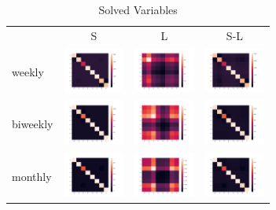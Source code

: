 \documentclass[10pt,conference]{IEEEtran}
\begin{document}
\begin{table}[h]
    \centering
    \begin{tabular}{l c c c }
          & S & L & S-L\\
         weekly &  \includegraphics[width=2cm]{imgs/small_weekly_s.png}
         & \includegraphics[width=2cm]{imgs/small_weekly_l.png}
         & \includegraphics[width=2cm]{imgs/small_weekly_sl.png}\\ 
         biweekly  & \includegraphics[width=2cm]{imgs/small_biweekly_s.png}
         & \includegraphics[width=2cm]{imgs/small_biweekly_l.png} 
         & \includegraphics[width=2cm]{imgs/small_biweekly_sl.png}\\ 
         monthly  & \includegraphics[width=2cm]{imgs/small_monthly_s.png}
        & \includegraphics[width=2cm]{imgs/small_monthly_l.png}
        & \includegraphics[width=2cm]{imgs/small_monthly_sl.png}\\
    \end{tabular}
    \caption{Solved Variables}
    \label{table:solved_variables}
\end{table}
\end{document}
